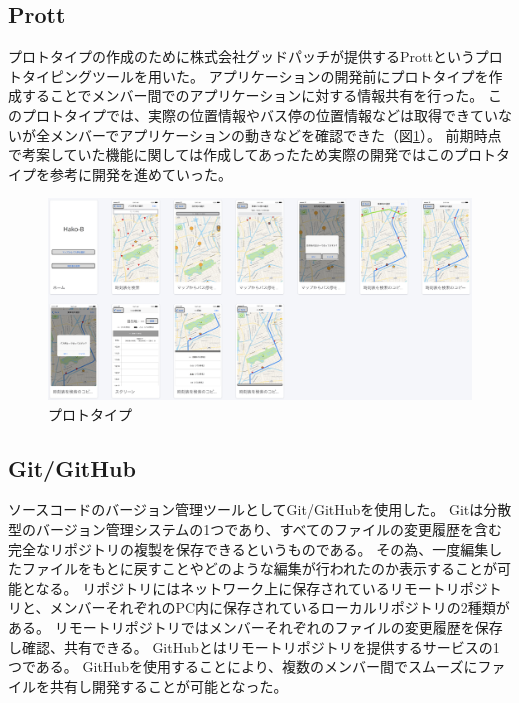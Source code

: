 \documentclass[openany,11pt,papersize]{jsbook}
\begin{document}

\subsection{Prott}
プロトタイプの作成のために株式会社グッドパッチが提供するProttというプロトタイピングツールを用いた\cite{Prott}。
アプリケーションの開発前にプロトタイプを作成することでメンバー間でのアプリケーションに対する情報共有を行った。
このプロトタイプでは、実際の位置情報やバス停の位置情報などは取得できていないが全メンバーでアプリケーションの動きなどを確認できた（図\ref{fig:prott}）。
前期時点で考案していた機能に関しては作成してあったため実際の開発ではこのプロトタイプを参考に開発を進めていった。

\begin{figure}[htbp]
  \begin{center}
    \includegraphics[clip,width=\hsize]{img/prott.png}
    \caption{プロトタイプ}
    \label{fig:prott}
  \end{center}
\end{figure}


\subsection{Git/GitHub}
ソースコードのバージョン管理ツールとしてGit/GitHubを使用した。
Gitは分散型のバージョン管理システムの1つであり、すべてのファイルの変更履歴を含む完全なリポジトリの複製を保存できるというものである。
その為、一度編集したファイルをもとに戻すことやどのような編集が行われたのか表示することが可能となる。
リポジトリにはネットワーク上に保存されているリモートリポジトリと、メンバーそれぞれのPC内に保存されているローカルリポジトリの2種類がある\cite{b}。
リモートリポジトリではメンバーそれぞれのファイルの変更履歴を保存し確認、共有できる。
GitHubとはリモートリポジトリを提供するサービスの1つである。
GitHubを使用することにより、複数のメンバー間でスムーズにファイルを共有し開発することが可能となった。
\end{document}
